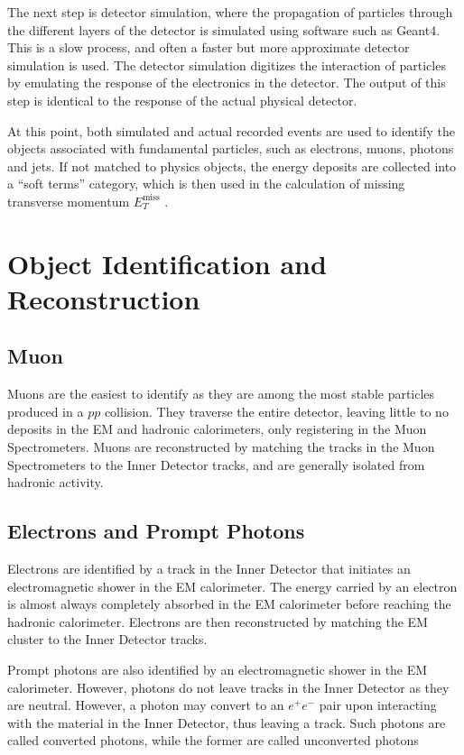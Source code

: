 \documentclass[11pt,a4paper,openright,twoside]{report}
\newcommand{\met}{$E_T^{\mathrm{miss}}$ }
\begin{document}
The next step is detector simulation, where the propagation of particles through the different layers of the detector is simulated using software such as Geant4\cite{geant4}. This is a slow process, and often a faster but more approximate detector simulation is used. The detector simulation digitizes the interaction of particles by emulating the response of the electronics in the detector. The output of this step is identical to the response of the actual physical detector.

At this point, both simulated and actual recorded events are used to identify the objects associated with fundamental particles, such as electrons, muons, photons and jets. If not matched to physics objects, the energy deposits are collected into a ``soft terms'' category, which is then used in the calculation of missing transverse momentum \met.

\section{Object Identification and Reconstruction}

\subsection{Muon}
Muons are the easiest to identify as they are among the most stable particles produced in a $pp$ collision. They traverse the entire detector, leaving little to no deposits in the EM and hadronic calorimeters, only registering in the Muon Spectrometers. Muons are reconstructed by matching the tracks in the Muon Spectrometers to the Inner Detector tracks, and are generally isolated from hadronic activity.

\subsection{Electrons and Prompt Photons}
Electrons are identified by a track in the Inner Detector that initiates an electromagnetic shower in the EM calorimeter. The energy carried by an electron is almost always completely absorbed in the EM calorimeter before reaching the hadronic calorimeter. Electrons are then reconstructed by matching the EM cluster to the Inner Detector tracks.

Prompt photons are also identified by an electromagnetic shower in the EM calorimeter. However, photons do not leave tracks in the Inner Detector as they are neutral. However, a photon may convert to an $e^+e^-$ pair upon interacting with the material in the Inner Detector, thus leaving a track. Such photons are called converted photons, while the former are called unconverted photons
\end{document}
